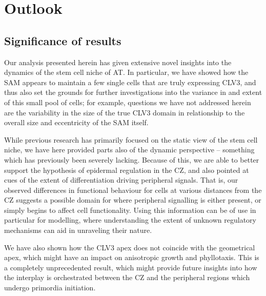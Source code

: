 \chapter{Outlook}

\ifpdf
\graphicspath{{Chapter5/Figs/Raster/}{Chapter5/Figs/PDF/}{Chapter5/Figs/}}
\else
\graphicspath{{Chapter5/Figs/Vector/}{Chapter5/Figs/}}
\fi

\section{Significance of results}
Our analysis presented herein has given extensive novel insights into the dynamics of
the stem cell niche of AT. In particular, we have showed how the SAM appears to
maintain a few single cells that are truly expressing CLV3, and thus also set
the grounds for further investigations into the variance in and extent of this small
pool of cells; for example, questions we have not addressed herein are the
variability in the size of the true CLV3 domain in relationship to the overall
size and eccentricity of the SAM itself. 

While previous research has primarily focused on the static view of the stem
cell niche, we have here provided parts also of the dynamic perspective --
something which has previously been severely lacking. Because of this, we are
able to better support the hypothesis of epidermal regulation in the
CZ, and also pointed at cues of the extent of differentiation driving peripheral
signals. That is, our observed differences in functional behaviour for cells at
various distances from the CZ suggests a possible domain for where peripheral
signalling is either present, or simply begins to affect cell functionality.
Using this information can be of use in particular for modelling, where
understanding the extent of unknown regulatory mechanisms can aid in unraveling
their nature.

% 
We have also shown how the CLV3 apex does not coincide with the geometrical
apex, which might have an impact on anisotropic growth and phyllotaxis. This is
a completely unprecedented result, which might provide future insights into how
the interplay is orchestrated between the CZ and the peripheral regions which
undergo primordia initiation.

